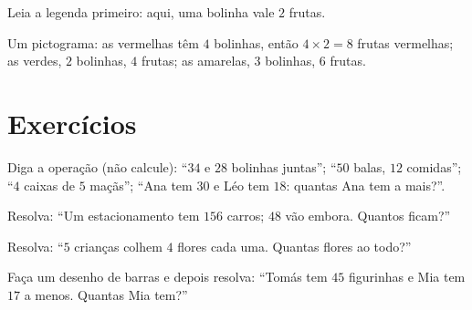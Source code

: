 \begin{example}[Um pictograma]\label{ex:g2:problems:pictogram}
Leia a legenda primeiro: aqui, uma bolinha vale $2$ frutas.

\begin{omfigure}

{\small Um pictograma: as vermelhas têm $4$ bolinhas, então
$4 \times 2 = 8$ frutas vermelhas; as verdes, $2$ bolinhas, $4$
frutas; as amarelas, $3$ bolinhas, $6$ frutas.}
\end{omfigure}
\end{example}

\section{Exercícios}

\begin{exercise}[$\star$]\label{exo:g2:problems:1}
Diga a operação (não calcule): ``$34$ e $28$ bolinhas juntas''; ``$50$
balas, $12$ comidas''; ``$4$ caixas de $5$ maçãs''; ``Ana tem $30$ e
Léo tem $18$: quantas Ana tem a mais?''.
\end{exercise}

\begin{exercise}[$\star$]\label{exo:g2:problems:2}
Resolva: ``Um estacionamento tem $156$ carros; $48$ vão embora.
Quantos ficam?''
\end{exercise}

\begin{exercise}[$\star$]\label{exo:g2:problems:3}
Resolva: ``$5$ crianças colhem $4$ flores cada uma. Quantas flores ao
todo?''
\end{exercise}

\begin{exercise}[$\star$]\label{exo:g2:problems:4}
Faça um desenho de barras e depois resolva: ``Tomás tem $45$
figurinhas e Mia tem $17$ a menos. Quantas Mia tem?''
\end{exercise}

